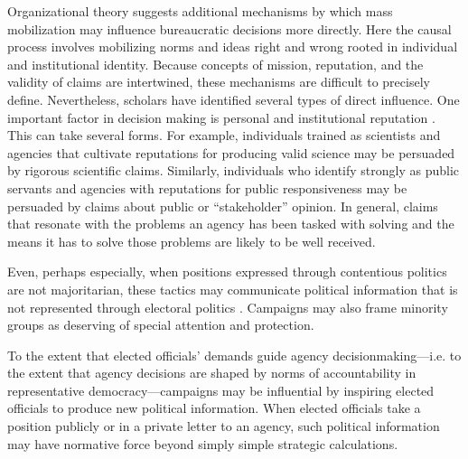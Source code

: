 
Organizational theory suggests additional mechanisms by which mass mobilization may influence bureaucratic decisions more directly. Here the causal process involves mobilizing norms and ideas right and wrong rooted in individual and institutional identity. Because concepts of mission, reputation, and the validity of claims are intertwined, these mechanisms are difficult to precisely define. Nevertheless, scholars have identified several types of direct influence. One important factor in decision making is personal and institutional reputation \citep{Carpenter2001}. This can take several forms. For example, individuals trained as scientists and agencies that cultivate reputations for producing valid science may be persuaded by rigorous scientific claims. Similarly, individuals who identify strongly as public servants and agencies with reputations for public responsiveness may be persuaded by claims about public or ``stakeholder'' opinion. In general, claims that resonate with the problems an agency has been tasked with solving and the means it has to solve those problems are likely to be well received. 

Even, perhaps especially, when positions expressed through contentious politics
are not majoritarian, these tactics may communicate political information that is not represented through electoral politics \citep{Gillion2012, Gillion2013}. 
Campaigns may also frame minority groups as deserving of special attention and protection.

To the extent that elected officials' demands guide agency decisionmaking---i.e. to the extent that agency decisions are shaped by norms of accountability in representative democracy---campaigns may be influential by inspiring elected officials to produce new political information. When elected officials take a position publicly or in a private letter to an agency, such political information may have normative force beyond simply simple strategic calculations.

